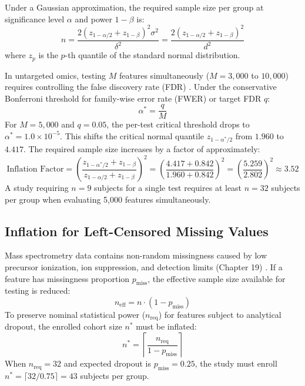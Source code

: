 \documentclass[11pt,twoside,openright]{book}
\begin{document}
Under a Gaussian approximation, the required sample size per group at significance level $\alpha$ and power $1 - \beta$ is:
\begin{equation}
n = \frac{2 \left( z_{1 - \alpha/2} + z_{1 - \beta} \right)^2 \sigma^2}{\delta^2} = \frac{2 \left( z_{1 - \alpha/2} + z_{1 - \beta} \right)^2}{d^2}
\label{eq:analytical_n}
\end{equation}
where $z_p$ is the $p$-th quantile of the standard normal distribution.

In untargeted omics, testing $M$ features simultaneously ($M = 3,000$ to $10,000$) requires controlling the false discovery rate (FDR) \cite{benjamini1995controlling}. Under the conservative Bonferroni threshold for family-wise error rate (FWER) or target FDR $q$:
\begin{equation}
\alpha^* = \frac{q}{M}
\label{eq:bonferroni_alpha}
\end{equation}
For $M = 5,000$ and $q = 0.05$, the per-test critical threshold drops to $\alpha^* = 1.0 \times 10^{-5}$. This shifts the critical normal quantile $z_{1 - \alpha^*/2}$ from $1.960$ to $4.417$. The required sample size increases by a factor of approximately:
\begin{equation}
\text{Inflation Factor} = \left( \frac{z_{1 - \alpha^*/2} + z_{1 - \beta}}{z_{1 - \alpha/2} + z_{1 - \beta}} \right)^2 = \left( \frac{4.417 + 0.842}{1.960 + 0.842} \right)^2 = \left( \frac{5.259}{2.802} \right)^2 \approx 3.52
\end{equation}
A study requiring $n = 9$ subjects for a single test requires at least $n = 32$ subjects per group when evaluating 5,000 features simultaneously.

\subsection{Inflation for Left-Censored Missing Values}

Mass spectrometry data contains non-random missingness caused by low precursor ionization, ion suppression, and detection limits (Chapter 19) \cite{karpievitch2012normalization}. If a feature has missingness proportion $p_{\text{miss}}$, the effective sample size available for testing is reduced:
\begin{equation}
n_{\text{eff}} = n \cdot (1 - p_{\text{miss}})
\label{eq:n_effective}
\end{equation}
To preserve nominal statistical power ($n_{\text{req}}$) for features subject to analytical dropout, the enrolled cohort size $n^*$ must be inflated:
\begin{equation}
n^* = \left\lceil \frac{n_{\text{req}}}{1 - p_{\text{miss}}} \right\rceil
\label{eq:n_inflated}
\end{equation}
When $n_{\text{req}} = 32$ and expected dropout is $p_{\text{miss}} = 0.25$, the study must enroll $n^* = \lceil 32 / 0.75 \rceil = 43$ subjects per group.
\end{document}
